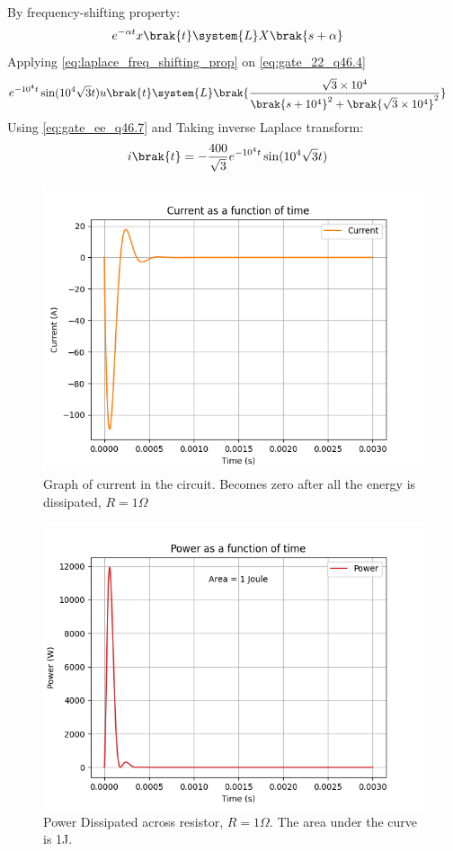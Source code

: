 \documentclass[journal,12pt,twocolumn]{IEEEtran}
\theoremstyle{remark}
\begin{document}
By frequency-shifting property:
\begin{align}
    e^{-\alpha t}x\brak{t} &\system{L} X\brak{s+\alpha} \label{eq:laplace_freq_shifting_prop}
\end{align}
Applying \eqref{eq:laplace_freq_shifting_prop} on \eqref{eq:gate_22_q46.4}
\begin{align}
    e^{-10^4t}\sin(10^4\sqrt{3}t)u\brak{t} &\system{L} \brak{\frac{\sqrt{3}\times10^4}{\brak{s+10^4}^2+\brak{\sqrt{3}\times10^4}^2}} \label{eq:gate_ee_q46.7}
\end{align}
Using \eqref{eq:gate_ee_q46.7} and  Taking inverse Laplace transform:
\begin{align}
    i\brak{t} &= -\frac{400}{\sqrt{3}}e^{-10^4 t}\sin(10^4\sqrt{3}t)
    \end{align}


\begin{figure}[H]
    \includegraphics[width=1\columnwidth]{ncert-physics/12/7/12/figs/Current_in_circuit_during_damping.png }
    \caption{Graph of current in the circuit. Becomes zero after all the energy is dissipated, $R=1\Omega$}
    \label{fig:current_in_damping}
\end{figure}

\begin{figure}[H]
    \includegraphics[width=1\columnwidth]{ncert-physics/12/7/12/figs/Power_Dissipated_across_Resistor.png }
    \caption{Power Dissipated across resistor, $R=1\Omega$. The area under the curve is 1J.}
    \label{fig:power_in_damping}
\end{figure}

\end{document}
